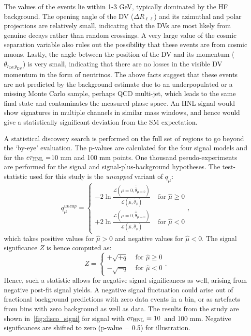 The \mdv values of the events lie within 1-3 GeV, typically dominated by the HF background. The opening angle of the DV ($\Delta R_{\ell\ell}$) and its azimuthal and polar projections are relatively small, indicating that the DVs are most likely from genuine decays rather than random crossings. A very large value of the cosmic separation variable also rules out the possibility that these events are from cosmic muons. Lastly, the angle between the position of the DV and its momentum ($\theta_{r_\mathrm{DV}p_\mathrm{DV}}$) is very small, indicating that there are no losses in the visible DV momentum in the form of neutrinos. The above facts suggest that these events are not predicted by the background estimate due to an underpopulated or a missing Monte Carlo sample, perhaps QCD multi-jet, which leads to the same final state and contaminates the measured phase space. An HNL signal would show signatures in multiple channels in similar mass windows, and hence would give a statistically significant deviation from the SM expectation.

A statistical discovery search is performed on the full set of regions to go beyond the `by-eye' evaluation. The p-values are calculated for the four signal models and for the $c\tau_\mathrm{HNL}=$10 mm and 100 mm points. One thousand pseudo-experiments are performed for the signal and signal-plus-background hypotheses. The test-statistic used for this study is the \textit{uncapped} variant of $q_{\mu}$:
\begin{equation}
    q_\mu^{uncap} = 
    \begin{cases} 
    -2\ln\frac{\mathcal{L}(\mu=0, \hat{\hat{\theta}}_{\mu=0})}{\mathcal{L}(\hat{\mu}, \hat{\theta}_\mu)} & \text { for } \hat{\mu} \geq 0 \\ 
    +2 \ln \frac{\mathcal{L}(\mu=0, \hat{\hat{\theta}}_{\mu=0})}{\mathcal{L}(\hat{\mu}, \hat{\theta}_\mu)} & \text { for } \hat{\mu}<0
    \end{cases}
    ,
\end{equation}
which takes positive values for $\hat{\mu}>0$ and negative values for $\hat{\mu}<0$. The signal significance $Z$ is hence computed as:
\begin{equation}
    Z = 
    \begin{cases} 
    +\sqrt{+q} & \text { for } \hat{\mu} \geq 0 \\ 
    -\sqrt{-q} & \text { for } \hat{\mu} < 0
    \end{cases}.
\end{equation}
Hence, such a statistic allows for negative signal significances as well, arising from negative post-fit signal yields. A negative signal fluctuation could arise out of fractional background predictions with zero data events in a bin, or as artefacts from bins with zero background as well as data. The results from the study are shown in~\cref{fig:disco_signi} for signal with $c\tau_\mathrm{HNL}=10$~and 100 mm. Negative significances are shifted to zero (p-value = 0.5) for illustration.

